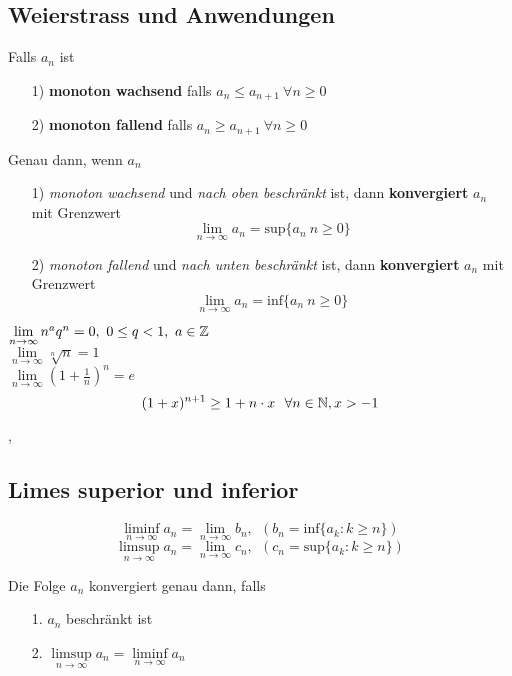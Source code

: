 \subsection{Weierstrass und Anwendungen}

\Def[2.2.1] Falls  $a_{n}$ ist
\begin{enumerate}
\item[1)] \textbf{monoton wachsend}  falls ${a_{n} \leq a_{n + 1} \ \forall n \geq 0}$
\item[2)] \textbf{monoton fallend} falls ${a_{n} \geq a_{n + 1} \ \forall n \geq 0}$
\end{enumerate}

\Satz[2.2.2 (Weierstrass)] Genau dann, wenn $a_{n}$ 
\begin{enumerate}
\item[1)] \textit{monoton wachsend} und \textit{nach oben beschränkt} ist, dann \textbf{konvergiert} $a_{n}$ mit Grenzwert
\[ 
\lim\limits_{n \rightarrow \infty} a_{n} = \text{sup}\{a_{n} \: n \geq 0\}
\]
\item[2)] \textit{monoton fallend} und \textit{nach unten beschränkt} ist, dann \textbf{konvergiert} $a_{n}$ mit Grenzwert
\[ 
\lim\limits_{n \rightarrow \infty} a_{n} = \text{inf}\{a_{n} \: n \geq 0\}
\]
\end{enumerate}
\Bsp[2.2.3] $\lim\limits_{n \rightarrow \infty} n^{a}q^{n} = 0, \ 0 \leq q < 1, \ a \in \mathbb{Z}$ \\
\Bsp[2.2.5] $\lim\limits_{n \rightarrow \infty} \sqrt[n]{n} = 1$ \\
\Bsp[2.2.6] $\lim\limits_{n \rightarrow \infty} (1 + \frac{1}{n})^n = e$ \\
\[
(1 + x)^{n+1} \geq 1 + n \cdot x \ \ \forall n \in \N, x > -1
\] 

\sep

\subsection{Limes superior und inferior}

\Def[2.3.0]
\[
\liminf\limits_{n \rightarrow \infty} a_{n} = \lim\limits_{n \rightarrow \infty} b_{n}, \ \ (b_{n} = \text{inf} \{a_{k} : k \geq n \})
\]
\[
\limsup\limits_{n \rightarrow \infty} a_{n} = \lim\limits_{n \rightarrow \infty} c_{n}, \ \ (c_{n} = \text{sup} \{a_{k} : k \geq n \})
\]

\Lemma[2.4.1] Die Folge $a_{n}$ konvergiert genau dann, falls
\begin{enumerate}
\item[1.] $a_{n}$ beschränkt ist
\item[2.] $\limsup\limits_{n \rightarrow \infty} a_{n} = \liminf\limits_{n \rightarrow \infty} a_{n}$
\end{enumerate}


